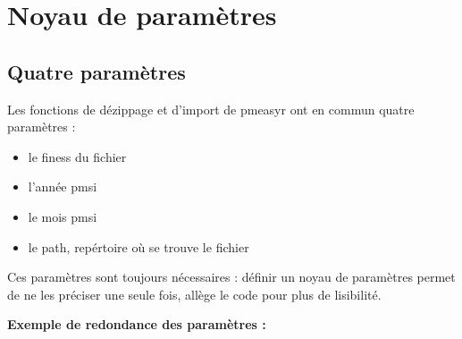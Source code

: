 \documentclass[]{book}
\providecommand{\tightlist}{%
  \setlength{\itemsep}{0pt}\setlength{\parskip}{0pt}}
\begin{document}
\chapter{Noyau de paramètres}\label{noyau-de-parametres}

\section{Quatre paramètres}\label{quatre-parametres}

Les fonctions de dézippage et d'import de pmeasyr ont en commun quatre
paramètres :

\begin{itemize}
\tightlist
\item
  le finess du fichier
\item
  l'année pmsi
\item
  le mois pmsi
\item
  le path, repértoire où se trouve le fichier
\end{itemize}

Ces paramètres sont toujours nécessaires : définir un noyau de
paramètres permet de ne les préciser une seule fois, allège le code pour
plus de lisibilité.

\textbf{Exemple de redondance des paramètres :}
\end{document}
